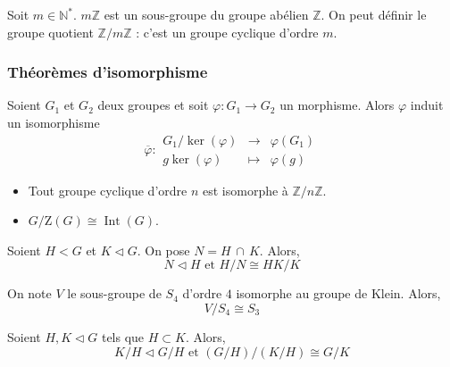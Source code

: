 	\begin{example}
		Soit $m \in \mathbb{N}^*$. $m \mathbb{Z}$ est un sous-groupe du groupe abélien $\mathbb{Z}$. On peut définir le groupe quotient $\mathbb{Z}/m\mathbb{Z}$ : c'est un groupe cyclique d'ordre $m$.
	\end{example}
	
	\subsubsection{Théorèmes d'isomorphisme}
	
	
	\begin{theorem}
		Soient $G_1$ et $G_2$ deux groupes et soit $\varphi : G_1 \rightarrow G_2$ un morphisme. Alors $\varphi$ induit un isomorphisme
		\[
			\overline{\varphi} :
			\begin{array}{ccc}
				G_1 / \ker(\varphi) &\rightarrow& \varphi(G_1) \\
				g\ker(\varphi) &\mapsto& \varphi(g)
			\end{array}
		\]
	\end{theorem}
	
	\begin{example}
		\begin{itemize}
			\item Tout groupe cyclique d'ordre $n$ est isomorphe à $\mathbb{Z}/n\mathbb{Z}$.
			\item $G/\mathrm{Z}(G) \cong \operatorname{Int}(G)$.
		\end{itemize}
	\end{example}
	
	
	\begin{theorem}
		Soient $H < G$ et $K \lhd G$. On pose $N = H \, \cap \, K$. Alors,
		\[ N \lhd H \text{ et } H/N \cong HK/K \]
	\end{theorem}
	
	\begin{example}
		On note $V$ le sous-groupe de $S_4$ d'ordre $4$ isomorphe au groupe de Klein. Alors,
		\[ V/S_4 \cong S_3 \]
	\end{example}
	
	
	\begin{theorem}
		Soient $H, K \lhd G$ tels que $H \subset K$. Alors,
		\[ K/H \lhd G/H \text{ et } (G/H)/(K/H) \cong G/K \]
	\end{theorem}
	
